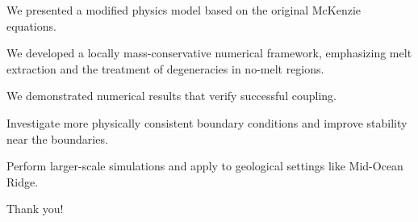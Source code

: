 \documentclass[usenames,dvipsnames,letterpaper,landscape,final]{slides}
\theoremstyle{definition}
\begin{document}
\begin{myslide}

		  \begin{nlist}
		  \item We presented a modified physics model based on the original McKenzie equations.

		  \item We developed a locally mass-conservative numerical framework, emphasizing melt extraction and the treatment of degeneracies in no-melt regions.

		  \item We demonstrated numerical results that verify successful coupling.

		  \end{nlist}

		  \bigskip
		  \begin{blist}
		  \item Investigate more physically consistent boundary conditions and improve stability near the boundaries.
        \item Perform larger-scale simulations and apply to geological settings
					 like Mid-Ocean Ridge.
		  \end{blist}

\vspace{2cm}

\centering
Thank you!

\end{myslide}
\end{document}
